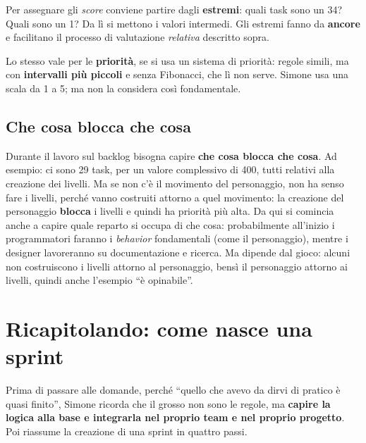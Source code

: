 Per assegnare gli \emph{score} conviene partire dagli
\textbf{estremi}: quali task sono un 34? Quali sono un 1? Da lì si mettono i
valori intermedi. Gli estremi fanno da \textbf{ancore} e facilitano il
processo di valutazione \emph{relativa} descritto sopra.

Lo stesso vale per le \textbf{priorità}, se si usa un sistema di priorità:
regole simili, ma con \textbf{intervalli più piccoli} e senza Fibonacci, che
lì non serve. Simone usa una scala da 1 a 5; ma non la considera così
fondamentale.

\subsection{Che cosa blocca che cosa}

Durante il lavoro sul backlog bisogna capire \textbf{che cosa blocca che
cosa}. Ad esempio: ci sono 29 task, per un valore complessivo di 400, tutti
relativi alla creazione dei livelli. Ma se non c'è il movimento del
personaggio, non ha senso fare i livelli, perché vanno costruiti attorno a
quel movimento: la creazione del personaggio \textbf{blocca} i livelli e
quindi ha priorità più alta. Da qui si comincia anche a capire quale reparto
si occupa di che cosa: probabilmente all'inizio i programmatori faranno i
\emph{behavior} fondamentali (come il personaggio), mentre i designer
lavoreranno su documentazione e ricerca. Ma dipende dal gioco: alcuni non
costruiscono i livelli attorno al personaggio, bensì il personaggio attorno ai
livelli, quindi anche l'esempio ``è opinabile''.

\section{Ricapitolando: come nasce una sprint}
\label{sec:z3-ricapitolo}

Prima di passare alle domande, perché ``quello che avevo da dirvi di pratico è
quasi finito'', Simone ricorda che il grosso non sono le regole, ma
\textbf{capire la logica alla base e integrarla nel proprio team e nel
proprio progetto}. Poi riassume la creazione di una sprint in quattro passi.

